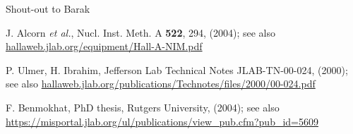 \documentclass{article}
\begin{document}
\clearpage
\begin{thebibliography}{99}

\bibitem{}
Shout-out to Barak

J. Alcorn \textit{et al.}, Nucl. Inst. Meth. A \textbf{522}, 294, (2004); see also \url{hallaweb.jlab.org/equipment/Hall-A-NIM.pdf} 

P. Ulmer, H. Ibrahim, Jefferson Lab Technical Notes JLAB-TN-00-024, (2000); see also \url{hallaweb.jlab.org/publications/Technotes/files/2000/00-024.pdf}

F. Benmokhat, PhD thesis, Rutgers University, (2004); see also \url{https://misportal.jlab.org/ul/publications/view_pub.cfm?pub_id=5609}

\end{thebibliography}


\end{document}
